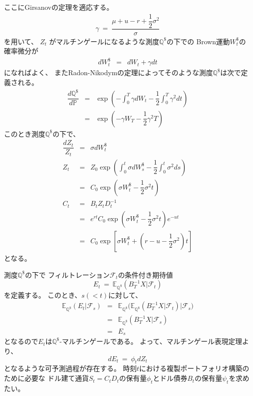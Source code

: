 \documentclass[uplatex,a4j,12pt,dvipdfmx]{jsarticle}
\begin{document}
ここにGirsanovの定理を適応する。
%
%
\begin{eqnarray*}
	\gamma
	\ = \
	\dfrac{ \mu + u - r + \dfrac{1}{2} \sigma^{2} }{\sigma}
\end{eqnarray*}
%
%
を用いて、
$Z_{t}$
がマルチンゲールになるような測度$\mathbb{Q}^{\$}$の下での
Brown運動$W^{\$}_{t}$の確率微分が
%
%
\begin{eqnarray*}
	d W^{\$}_{t}
	&=&
	d W_{t}
	+
	\gamma dt
\end{eqnarray*}
%
%
になればよく、
またRadon-Nikodymの定理によってそのような測度$\mathbb{Q}^{\$}$は次で定義される。
%
%
\begin{eqnarray*}
	\dfrac{ d \mathbb{Q}^{\$} }{ d \mathbb{P} }
	&=&
	\exp
	\left(
	- \int^{T}_{0} \gamma dW_{t}
	- \dfrac{1}{2} \int^{T}_{0} \gamma^{2} dt
	\right)
	\\ &=&
	\exp
	\left(
	-\gamma W_{T}
	- \dfrac{1}{2} \gamma^{2}T
	\right)
\end{eqnarray*}
%
%
このとき測度$\mathbb{Q}^{\$}$の下で、
%
%
\begin{eqnarray*}
	\dfrac{ d Z_{t} }{ Z_{t} }
	&=&
	\sigma dW^{\$}_{t}
	\\
	Z_{t}
	&=&
	Z_{0} \exp
	\left(
	\int^{t}_{0} \sigma dW^{\$}_{s}
	-
	\dfrac{1}{2}
	\int^{t}_{0} \sigma^{2} ds
	\right)
	\\ &=&
	C_{0}
	\exp
	\left(
	\sigma W^{\$}_{t}
	-
	\dfrac{1}{2}
	\sigma^{2} t
	\right)
	\\
	C_{t}
	&=&
	B_{t} Z_{t} D^{-1}_{t}
	\\ &=&
	e^{rt}
	C_{0}
	\exp
	\left(
	\sigma W^{\$}_{t}
	-
	\dfrac{1}{2}
	\sigma^{2} t
	\right)
	e^{-ut}
	\\ &=&
	C_{0}
	\exp
	\left[
		\sigma W^{\$}_{t}
		+
		\left(
		r - u -
		\dfrac{1}{2}
		\sigma^{2}
		\right) t
		\right]
\end{eqnarray*}
%
%
となる。

測度$\mathbb{Q}^{\$}$の下で
フィルトレーション$\mathcal{F}_{t}$の条件付き期待値
$$
	E_{t}
	\ = \
	\mathbb{E}_{\mathbb{Q}^{ \$ }}
	( B_{T}^{-1} X | \mathcal{F}_{t} )
$$
を定義する。
このとき、$s(<t)$に対して、
%
%
\begin{eqnarray*}
	\mathbb{E}_{\mathbb{Q}^{ \$ }}
	( E_{t} | \mathcal{F}_{s} )
	&=&
	\mathbb{E}_{\mathbb{Q}^{ \$ }}
	\Big(
	\mathbb{E}_{\mathbb{Q}^{ \$ }}
	( B_{T}^{-1} X | \mathcal{F}_{t} )
	\Big| \mathcal{F}_{s} \Big)
	\\ &=&
	\mathbb{E}_{\mathbb{Q}^{ \$ }}
	( B_{T}^{-1} X | \mathcal{F}_{s} )
	\\ &=&
	E_{s}
\end{eqnarray*}
%
%
となるので$E_{t}$は$\mathbb{Q}^{ \$ }$-マルチンゲールである。
よって、マルチンゲール表現定理より、
$$
	dE_{t} \ = \ \phi_{t} dZ_{t}
$$
となるような可予測過程が存在する。
時刻$t$における複製ポートフォリオ構築のために必要な
ドル建て通貨$S_{t} = C_{t} D_{t}$の保有量$\phi_{t}$とドル債券$B_{t}$の保有量$\psi_{t}$を求めたい。
\end{document}
